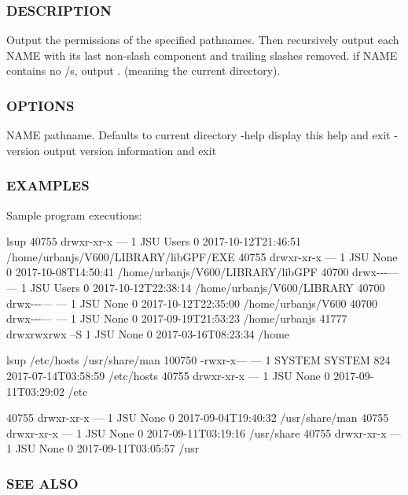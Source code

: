 \subsubsection*{D\+E\+S\+C\+R\+I\+P\+T\+I\+ON}

Output the permissions of the specified pathnames. Then recursively output each N\+A\+ME with its last non-\/slash component and trailing slashes removed. if N\+A\+ME contains no /\textquotesingle{}s, output \textquotesingle{}.\textquotesingle{} (meaning the current directory).

\subsubsection*{O\+P\+T\+I\+O\+NS}

N\+A\+ME pathname. Defaults to current directory -\/help display this help and exit -\/version output version information and exit

\subsubsection*{E\+X\+A\+M\+P\+L\+ES}

Sample program executions\+:

lsup 40755 drwxr-\/xr-\/x --- 1 J\+SU Users 0 2017-\/10-\/12\+T21\+:46\+:51 /home/urbanjs/\+V600/\+L\+I\+B\+R\+A\+R\+Y/lib\+G\+P\+F/\+E\+XE 40755 drwxr-\/xr-\/x --- 1 J\+SU None 0 2017-\/10-\/08\+T14\+:50\+:41 /home/urbanjs/\+V600/\+L\+I\+B\+R\+A\+R\+Y/lib\+G\+PF 40700 drwx-\/-\/-\/--- --- 1 J\+SU Users 0 2017-\/10-\/12\+T22\+:38\+:14 /home/urbanjs/\+V600/\+L\+I\+B\+R\+A\+RY 40700 drwx-\/-\/-\/--- --- 1 J\+SU None 0 2017-\/10-\/12\+T22\+:35\+:00 /home/urbanjs/\+V600 40700 drwx-\/-\/-\/--- --- 1 J\+SU None 0 2017-\/09-\/19\+T21\+:53\+:23 /home/urbanjs 41777 drwxrwxrwx --S 1 J\+SU None 0 2017-\/03-\/16\+T08\+:23\+:34 /home

lsup /etc/hosts /usr/share/man 100750 -\/rwxr-\/x--- --- 1 S\+Y\+S\+T\+EM S\+Y\+S\+T\+EM 824 2017-\/07-\/14\+T03\+:58\+:59 /etc/hosts 40755 drwxr-\/xr-\/x --- 1 J\+SU None 0 2017-\/09-\/11\+T03\+:29\+:02 /etc

40755 drwxr-\/xr-\/x --- 1 J\+SU None 0 2017-\/09-\/04\+T19\+:40\+:32 /usr/share/man 40755 drwxr-\/xr-\/x --- 1 J\+SU None 0 2017-\/09-\/11\+T03\+:19\+:16 /usr/share 40755 drwxr-\/xr-\/x --- 1 J\+SU None 0 2017-\/09-\/11\+T03\+:05\+:57 /usr

\subsubsection*{S\+EE A\+L\+SO}

